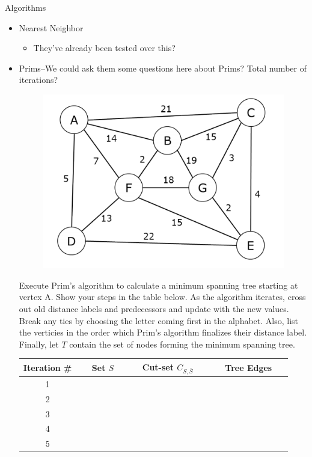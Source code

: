 \documentclass[12pt]{exam}
\begin{document}
Algorithms
\begin{itemize}

	\item Nearest Neighbor
	\begin{itemize}
		\item They've already been tested over this?
	\end{itemize}
	\item Prims--We could ask them some questions here about Prims? Total number of iterations?

	\begin{figure}[h]
	\center
	\includegraphics{prims_picture}
	\end{figure}

Execute Prim's algorithm to calculate a minimum spanning tree starting at vertex A. Show your steps in the table below. As the algorithm iterates, cross out old distance labels and predecessors and update with the new values. Break any ties by choosing the letter coming first in the alphabet. Also, list the verticies in the order which Prim's algorithm finalizes their distance label. Finally, let $T$ contain the set of nodes forming the minimum spanning tree.
	

\begin{center}
\begin{tabular}{|c|c|c|c|}
\hline
Iteration \# & $\quad$ Set $S \quad$    & $\quad$ Cut-set $C_{S,\bar{S}}$ $\quad$	&$\quad$	Tree Edges $\quad$ \\ \hline
1 & &  &  \\ \hline
2 & & & \\ \hline
3 & & & \\ \hline
4 & & & \\ \hline
5 & & & \\ \hline
\end{tabular}
\end{center}




\end{itemize}
\end{document}
